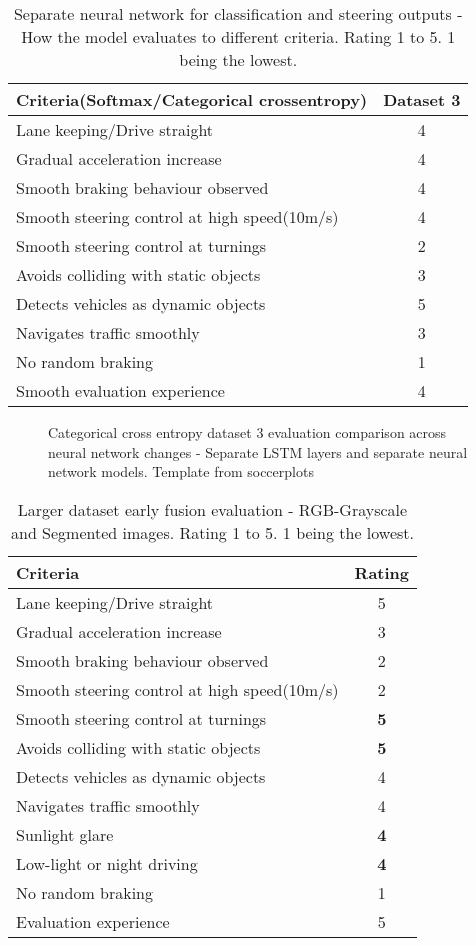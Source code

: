 \begin{table}[!ht]
    \centering
\begin{tabular}{lc}
    \toprule
    Criteria(Softmax/Categorical crossentropy) & Dataset 3 \\\midrule
    Lane keeping/Drive straight  & 4  \\
    Gradual acceleration increase  & 4\\
    Smooth braking behaviour observed & 4 \\
    Smooth steering control at high speed(10m/s) & 4 \\
    Smooth steering control at turnings & 2\\
    Avoids colliding with static objects & 3 \\
    Detects vehicles as dynamic objects & 5 \\
    Navigates traffic smoothly & 3\\
    No random braking & 1 \\
    Smooth evaluation experience & 4 \\\bottomrule
\end{tabular}
\caption{Separate neural network for classification and steering outputs - How the model
evaluates to different criteria. Rating 1 to 5. 1 being the lowest.}
\label{table:cce2NN}
\end{table}
\begin{figure}[!ht]
    \centering
    \def\svgwidth{0.8\textwidth}
    
    \caption{Categorical cross entropy dataset 3 evaluation comparison across neural
    network changes - Separate LSTM layers and separate neural network models. Template from soccerplots\cite{soccerplots}}
    \label{fig:radarccecompare2}
\end{figure}
\begin{table}[!ht]
    \centering
\begin{tabular}{lc}
    \toprule
    Criteria & Rating \\\midrule
    Lane keeping/Drive straight  & 5  \\
    Gradual acceleration increase  & 3\\
    Smooth braking behaviour observed & 2 \\
    Smooth steering control at high speed(10m/s) & 2\\
    Smooth steering control at turnings & \textbf{5}\\
    Avoids colliding with static objects & \textbf{5} \\
    Detects vehicles as dynamic objects & 4\\
    Navigates traffic smoothly & 4\\
    Sunlight glare & \textbf{4} \\
    Low-light or night driving & \textbf{4} \\
    No random braking & 1 \\
    Evaluation experience & 5 \\\bottomrule
\end{tabular}
\caption{Larger dataset early fusion evaluation - RGB-Grayscale and Segmented images.
Rating 1 to 5. 1 being the lowest.}
\label{table:earlyfusionrgbseg200k}
\end{table}
